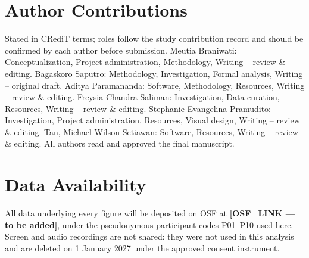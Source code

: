\documentclass[conference]{IEEEtran}
\begin{document}
\section*{Author Contributions}
Stated in CRediT terms; roles follow the study contribution record and should be confirmed by each
author before submission. Meutia Braniwati: Conceptualization, Project administration, Methodology,
Writing -- review \& editing. Bagaskoro Saputro: Methodology, Investigation, Formal analysis, Writing
-- original draft. Aditya Paramananda: Software, Methodology, Resources, Writing -- review \& editing.
Freysia Chandra Saliman: Investigation, Data curation, Resources, Writing -- review \& editing.
Stephanie Evangelina Pramudito: Investigation, Project administration, Resources, Visual design,
Writing -- review \& editing. Tan, Michael Wilson Setiawan: Software, Resources, Writing -- review \&
editing. All authors read and approved the final manuscript.

\section*{Data Availability}
All data underlying every figure will be deposited on OSF at \textbf{[OSF\_LINK --- to be added]},
under the pseudonymous participant codes P01--P10 used here. Screen and audio recordings are not
shared: they were not used in this analysis and are deleted on 1 January 2027 under the approved
consent instrument.
\end{document}
